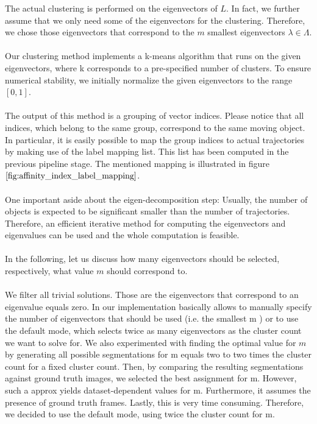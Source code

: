 The actual clustering is performed on the eigenvectors of $L$. In fact, we further assume that we only need some of the eigenvectors for the clustering. Therefore, we chose those eigenvectors that correspond to the $m$ smallest eigenvectors $\lambda \in \Lambda$. \\ \\
Our clustering method implements a k-means algorithm that runs on the given eigenvectors, where k corresponds to a pre-specified number of clusters. To ensure numerical stability, we initially normalize the given eigenvectors to the range $\left[ 0,1 \right]$. \\ \\
The output of this method is a grouping of vector indices. Please notice that all indices, which belong to the same group, correspond to the same moving object. In particular, it is easily possible to map the group indices to actual trajectories by making use of the label mapping list. This list has been computed in the previous pipeline stage. The mentioned mapping is illustrated in figure $\ref{fig:affinity_index_label_mapping}$. \\ \\
One important aside about the eigen-decomposition step: Usually, the number of objects is expected to be significant smaller than the number of trajectories. Therefore, an efficient iterative method for computing the eigenvectors and eigenvalues can be used and the whole computation is feasible. \\ \\
In the following, let us discuss how many eigenvectors should be selected, respectively, what value $m$ should correspond to. \\ \\
We filter all trivial solutions. Those are the eigenvectors that correspond to an eigenvalue equals zero. In our implementation basically allows to manually specify the number of eigenvectors that should be used (i.e. the smallest m ) or to use the default mode, which selects twice as many eigenvectors as the cluster count we want to solve for. We also experimented with finding the optimal value for $m$ by generating all possible segmentations for m equals two to two times the cluster count for a fixed cluster count. Then, by comparing the resulting segmentations against ground truth images, we selected the best assignment for m. However, such a approx yields dataset-dependent values for m. Furthermore, it assumes the presence of ground truth frames. Lastly, this is very time consuming. Therefore, we decided to use the default mode, using twice the cluster count for m. \\ \\
